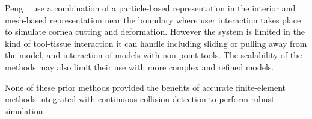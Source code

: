 Peng \etal~\autocite{peng:mta:2019} use a combination of a particle-based representation in the interior and mesh-based representation near the boundary where user interaction takes place to simulate cornea cutting and deformation. However the system is limited in the kind of tool-tissue interaction it can handle including sliding or pulling away from the model, and interaction of models with non-point tools. The scalability of the methods may also limit their use with more complex and refined models.

None of these prior methods provided the benefits of accurate finite-element methods integrated with continuous collision detection to perform robust simulation.
